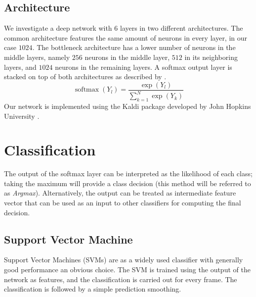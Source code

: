 \documentclass{article}
\DeclareMathOperator*{\softmax}{softmax}
\begin{document}
\subsection{Architecture}\label{sec:arch}
We investigate a deep network with $6$ layers in two different architectures. The common architecture features the same amount of neurons in every layer, in our case $1024$. The bottleneck architecture has a lower number of neurons in the middle layers, namely $256$ neurons in the middle layer, $512$ in its neighboring layers, and $1024$ neurons in the remaining layers\cite{grezl2007probabilistic}.
A softmax output layer is stacked on top of both architectures as described by .
\begin{equation}\label{softmax}
\softmax(Y_{l}) = \frac{\exp(Y_{l})}{\sum_{k=1}^N \exp(Y_{k})}
\end{equation}
Our network is implemented using the Kaldi package developed by John Hopkins University \cite{povey2011kaldi}.
 
\section{Classification}\label{sec:class}
The output of the softmax layer can be interpreted as the likelihood of each class; taking the maximum will provide a class decision (this method will be referred to as \textit{Argmax}). Alternatively, the output can be treated as intermediate feature vector that can be used as an input to other classifiers for computing the final decision. 
\subsection{Support Vector Machine}
Support Vector Machines (SVMs) are as a widely used classifier with generally good performance an obvious choice. The SVM is trained using the output of the network as features, and the classification is carried out for every frame. The classification is followed by a simple prediction smoothing.
\end{document}
